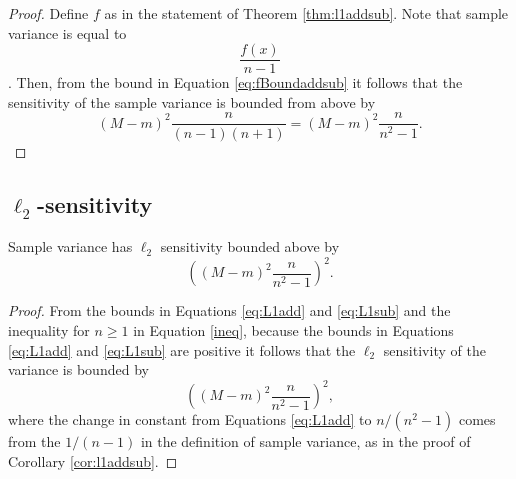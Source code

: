 \documentclass[11pt]{scrartcl} %
\begin{document}
 \begin{proof}
 Define $f$ as in the statement of Theorem \ref{thm:l1addsub}. Note that sample variance is equal to 
 $$ \frac{f(x)}{n-1} $$. Then, from the bound in Equation \ref{eq:fBoundaddsub} it follows that the sensitivity of the sample variance is bounded from above by 
 $$ \left( M-m \right)^2 \frac{n}{(n-1)(n + 1)} = \left( M-m \right)^2 \frac{n}{n^2 - 1}. $$
 \end{proof}

\subsection{$\ell_2$-sensitivity}

\begin{theorem}
Sample variance has $\ell_2$ sensitivity bounded above by
	$$ \left( \left( M-m \right)^2 \frac{n}{n^2 - 1} \right)^2.$$
\end{theorem}
\begin{proof}
From the bounds in Equations \ref{eq:L1add} and \ref{eq:L1sub} and the inequality for $n \ge 1$ in Equation \ref{ineq}, because the bounds in Equations \ref{eq:L1add} and \ref{eq:L1sub} are positive it follows that the $\ell_2$ sensitivity of the variance is bounded by 
$$
\left( \left( M-m \right)^2 \frac{n}{n^2 - 1} \right)^2,
$$
where the change in constant from Equations \ref{eq:L1add} to $n/(n^2 - 1)$ comes from the $1/(n-1)$ in the definition of sample variance, as in the proof of Corollary \ref{cor:l1addsub}.
\end{proof}



\end{document}
